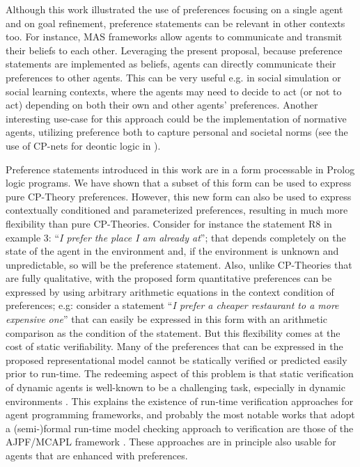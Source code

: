Although this work illustrated the use of preferences focusing on a single agent and on goal refinement, preference statements can be relevant in other contexts too. For instance, MAS frameworks allow agents to communicate and transmit their beliefs to each other. Leveraging the present proposal, because preference statements are implemented as beliefs, agents can directly communicate their preferences to other agents. This can be very useful e.g. in social simulation or social learning contexts, where the agents may need to decide to act (or not to act) depending on both their own and other agents' preferences. Another interesting use-case for this approach could be the implementation of normative agents, utilizing preference both to capture personal and societal norms (see the use of CP-nets for deontic logic in \cite{Sartor2020}).

Preference statements introduced in this work are in a form processable in Prolog logic programs. We have shown that a subset of this form can be used to express pure CP-Theory preferences. However, this new form can also be used to express contextually conditioned and parameterized preferences, resulting in much more flexibility than pure CP-Theories. Consider for instance the statement R8 in example 3: ``\textit{I prefer the place I am already at}''; that depends completely on the state of the agent in the environment and, if the environment is unknown and unpredictable, so will be the preference statement. 
Also, unlike CP-Theories that are fully qualitative, with the proposed form quantitative preferences can be expressed by using arbitrary arithmetic equations in the context condition of preferences; e.g: consider a statement ``\textit{I prefer a cheaper restaurant to a more expensive one}'' that can easily be expressed in this form with an arithmetic comparison as the condition of the statement.
But this flexibility %
comes at the cost of static verifiability. Many of the preferences that can be expressed in the proposed representational model %
cannot be statically verified or predicted easily prior to run-time. The redeeming aspect of this problem is that static verification of dynamic agents is well-known to be a challenging task, especially in dynamic environments \cite{Fisher2020,Ferrando2019}. This explains the existence of run-time verification approaches for agent programming frameworks, and probably the most notable works that adopt a (semi-)formal run-time model checking approach to verification are those of the AJPF/MCAPL framework \cite{Dennis2012,Dennis2016}. These approaches are in principle also usable for agents that are enhanced with preferences.

